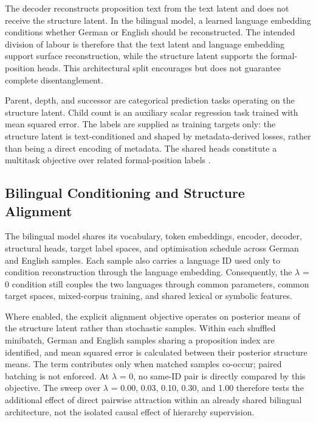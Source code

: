 \documentclass[webpdf,modern,medium,namedate]{oup-authoring-template}
\begin{document}
The decoder reconstructs proposition text from the text latent and does not receive the structure latent. In the bilingual model, a learned language embedding conditions whether German or English should be reconstructed. The intended division of labour is therefore that the text latent and language embedding support surface reconstruction, while the structure latent supports the formal-position heads. This architectural split encourages but does not guarantee complete disentanglement.

Parent, depth, and successor are categorical prediction tasks operating on the structure latent. Child count is an auxiliary scalar regression task trained with mean squared error. The labels are supplied as training targets only: the structure latent is text-conditioned and shaped by metadata-derived losses, rather than being a direct encoding of metadata. The shared heads constitute a multitask objective over related formal-position labels \citep{caruana1997multitask}.

\subsection{Bilingual Conditioning and Structure Alignment}
The bilingual model shares its vocabulary, token embeddings, encoder, decoder, structural heads, target label spaces, and optimisation schedule across German and English samples. Each sample also carries a language ID used only to condition reconstruction through the language embedding. Consequently, the $\lambda$ = 0 condition still couples the two languages through common parameters, common target spaces, mixed-corpus training, and shared lexical or symbolic features.

Where enabled, the explicit alignment objective operates on posterior means of the structure latent rather than stochastic samples. Within each shuffled minibatch, German and English samples sharing a proposition index are identified, and mean squared error is calculated between their posterior structure means. The term contributes only when matched samples co-occur; paired batching is not enforced. At $\lambda$ = 0, no same-ID pair is directly compared by this objective. The sweep over $\lambda$ = 0.00, 0.03, 0.10, 0.30, and 1.00 therefore tests the additional effect of direct pairwise attraction within an already shared bilingual architecture, not the isolated causal effect of hierarchy supervision.
\end{document}
